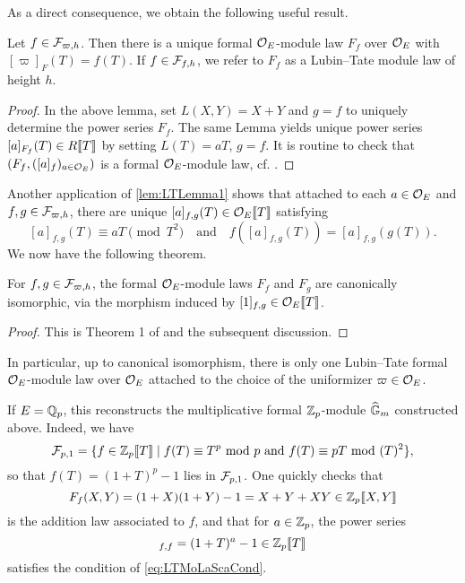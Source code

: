 \documentclass[../main.tex]{subfiles}
\begin{document}
As a direct consequence, we obtain the following useful result.
\begin{deflem} 
  Let $f \in \mathcal{F}_{\varpi, h}$. Then there is a unique formal ${\mathcal{O}_E}$-module
  law $F_f$ over ${\mathcal{O}_E}$ with $[\varpi]_F(T) = f(T)$. 
  If $f \in \mathcal{F}_{f, h}$, we refer to $F_f$ as a Lubin--Tate module law of height $h$.
\begin{proof}
  In the above lemma, set $L(X,Y) = X+Y$ and $g=f$ to uniquely determine 
  the power series $F_f$. The same Lemma yields unique power series
  $[a]_{F_f}(T) \in R\llbracket T \rrbracket$ by setting $L(T) = a T$, $g=f$. It is
  routine to check that $(F_f, ([a]_f)_{a \in {\mathcal{O}_E}})$ is a formal
  ${\mathcal{O}_E}$-module law, cf. \cite{LubinTateFormalMult}.
\end{proof}
\end{deflem}

Another application of \cref{lem:LTLemma1} shows that attached to each $a \in
\mathcal{O}_E$ and $f,g \in \mathcal{F}_{\varpi,h}$, there are unique $[a]_{f,g}(T) \in
\mathcal{O}_E\llbracket T \rrbracket$ satisfying
\begin{equation}\label{eq:LTMoLaScaCond}
  [a]_{f,g}(T) \equiv aT \pmod {T^2} \quad \text{and} \quad
  f([a]_{f,g}(T)) = [a]_{f,g}(g(T)).
\end{equation}
We now have the following theorem.
\begin{thm}\label{thm:LTModLaw}
  For $f,g \in \mathcal{F}_{\varpi,h}$, the formal $\mathcal{O}_E$-module laws $F_f$ and $F_g$ are
  canonically isomorphic, via the morphism induced by $[1]_{f,g} \in \mathcal{O}_E\llbracket
  T \rrbracket$. 
\begin{proof}
  This is Theorem 1 of \cite{LubinTateFormalMult} and the subsequent discussion.
\end{proof}
\end{thm}
In particular, up to canonical isomorphism, there is only one Lubin--Tate formal
$\mathcal{O}_E$-module law over $\mathcal{O}_E$ attached to the choice of the uniformizer $\varpi \in
\mathcal{O}_E$. 

\begin{xpl}
  If $E = \mathbb{Q}_p$, this reconstructs the multiplicative formal 
  $\mathbb{Z}_p$-module $\widehat{\mathbb{G}}_m$ constructed above. Indeed, we have 
  \begin{equation*}
    \mathcal{F}_{p,1} = \{f \in \mathbb{Z}_p\llbracket T \rrbracket \mid f(T) \equiv T^p \text{ mod } p
    \text{ and } f(T) \equiv pT \text{ mod } (T)^2 \},
  \end{equation*}
  so that $f(T) = (1+T)^p-1$ lies in $\mathcal{F}_{p,1}$.  
  One quickly checks that 
  \begin{equation*}
    F_f(X,Y) = (1+X)(1+Y) - 1 = X + Y + XY \in \mathbb{Z}_p \llbracket X,Y \rrbracket
  \end{equation*}
  is the addition law associated to $f$, and that 
  for $a \in \mathbb{Z}_p$, the power series
  \begin{equation*}
    [a]_{f,f} = (1+T)^{a} - 1 \in \Z_p \llbr T \rrbr
  \end{equation*}
  satisfies the condition of \eqref{eq:LTMoLaScaCond}. 
\end{xpl}
\end{document}
